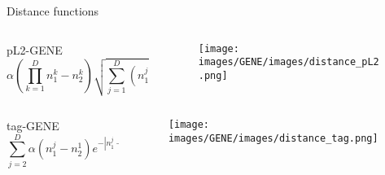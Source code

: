 \begin{frame}{\tciii{} Distance functions}

\begin{columns}
\begin{column}{0.60\linewidth}
\begin{block}{pL2-GENE}
\begin{equation}
\alpha \left  ( \prod_{k=1}^D n_1^k - n_2^k \right ) \sqrt{\sum_{j=1}^D \left( n_1^j - n_2^j \right)^2 }
\end{equation}
\end{block}
\end{column}

\begin{column}{0.35\linewidth}
\begin{figure}
\centering
\texttt{[image: images/GENE/images/distance\_pL2.png]}
\end{figure}
\end{column}
\end{columns}

\begin{columns}
\begin{column}{0.60\linewidth}
\begin{block}{tag-GENE}
\begin{equation}
\sum_{j=2}^D \alpha(n_1^j - n_2^1) e^{-|n_1^j - n_2^1|}
\end{equation}
\end{block}
\end{column}

\begin{column}{0.35\linewidth}
\begin{figure}
\centering
\texttt{[image: images/GENE/images/distance\_tag.png]}
\end{figure}
\end{column}
\end{columns}

\end{frame}


